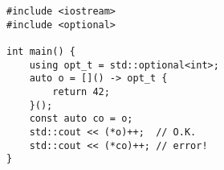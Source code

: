 \begin{lstlisting}[title=\href{https://godbolt.org/z/cT7E9j}{\texttt{godbolt.org/z/cT7E9j}}]
#include <iostream>
#include <optional>

int main() {
    using opt_t = std::optional<int>;
    auto o = []() -> opt_t {
        return 42;
    }();
    const auto co = o;
    std::cout << (*o)++;  // O.K.
    std::cout << (*co)++; // error!
}
\end{lstlisting}
